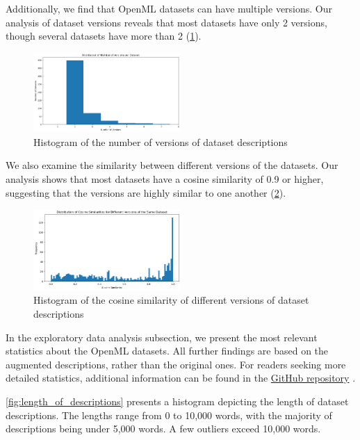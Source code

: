Additionally, we find that OpenML datasets can have multiple versions. Our analysis of dataset versions reveals that most datasets have only 2 versions, though several datasets have more than 2 (\cref{fig:number_of_versions}).
\begin{figure}[h]
    \centering
    \includegraphics[width=0.5\textwidth]{figures/number_of_versions.png}
    \caption{Histogram of the number of versions of dataset descriptions}
    \label{fig:number_of_versions}
\end{figure}

We also examine the similarity between different versions of the datasets. Our analysis shows that most datasets have a cosine similarity of 0.9 or higher, suggesting that the versions are highly similar to one another (\cref{fig:cosine_similarity_dataset_versions}).

\begin{figure}[h]
    \centering
    \includegraphics[width=0.5\textwidth]{figures/cosine_similarity_dataset_versions.png}
    \caption{Histogram of the cosine similarity of different versions of dataset descriptions}
    \label{fig:cosine_similarity_dataset_versions}
\end{figure}

In the exploratory data analysis subsection, we present the most relevant statistics about the OpenML datasets. All further findings are based on the augmented descriptions, rather than the original ones. For readers seeking more detailed statistics, additional information can be found in the \href{https://github.com/ivangermanov/openml-tags}{GitHub repository} \cite{germanov_topic_modeling_of_2024}.

\cref{fig:length_of_descriptions} presents a histogram depicting the length of dataset descriptions. The lengths range from 0 to 10,000 words, with the majority of descriptions being under 5,000 words. A few outliers exceed 10,000 words.

